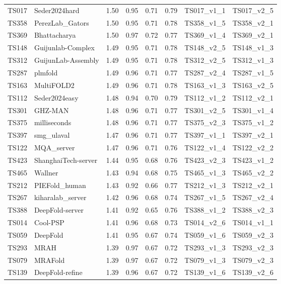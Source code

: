 \begin{table}[ht]
{\begin{tabular}{llllllll}
TS017 & Seder2024hard & 1.50 & 0.95 & 0.71 & 0.79 & TS017\_v1\_1 & TS017\_v2\_5 \\ 
TS358 & PerezLab\_Gators & 1.50 & 0.95 & 0.71 & 0.78 & TS358\_v1\_5 & TS358\_v2\_1 \\ 
TS369 & Bhattacharya & 1.50 & 0.97 & 0.72 & 0.77 & TS369\_v1\_4 & TS369\_v2\_1 \\ 
TS148 & Guijunlab-Complex & 1.49 & 0.95 & 0.71 & 0.78 & TS148\_v2\_5 & TS148\_v1\_3 \\ 
TS312 & GuijunLab-Assembly & 1.49 & 0.95 & 0.71 & 0.78 & TS312\_v2\_5 & TS312\_v1\_3 \\ 
TS287 & plmfold & 1.49 & 0.96 & 0.71 & 0.77 & TS287\_v2\_4 & TS287\_v1\_5 \\ 
TS163 & MultiFOLD2 & 1.49 & 0.96 & 0.71 & 0.78 & TS163\_v1\_3 & TS163\_v2\_5 \\ 
TS112 & Seder2024easy & 1.48 & 0.94 & 0.70 & 0.79 & TS112\_v1\_2 & TS112\_v2\_1 \\ 
TS301 & GHZ-MAN & 1.48 & 0.96 & 0.71 & 0.77 & TS301\_v2\_5 & TS301\_v1\_4 \\ 
TS375 & milliseconds & 1.48 & 0.96 & 0.71 & 0.77 & TS375\_v2\_3 & TS375\_v1\_2 \\ 
TS397 & smg\_ulaval & 1.47 & 0.96 & 0.71 & 0.77 & TS397\_v1\_1 & TS397\_v2\_1 \\ 
TS122 & MQA\_server & 1.47 & 0.96 & 0.71 & 0.76 & TS122\_v1\_4 & TS122\_v2\_2 \\ 
TS423 & ShanghaiTech-server & 1.44 & 0.95 & 0.68 & 0.76 & TS423\_v2\_3 & TS423\_v1\_2 \\ 
TS465 & Wallner & 1.43 & 0.94 & 0.68 & 0.75 & TS465\_v1\_3 & TS465\_v2\_2 \\ 
TS212 & PIEFold\_human & 1.43 & 0.92 & 0.66 & 0.77 & TS212\_v1\_3 & TS212\_v2\_1 \\ 
TS267 & kiharalab\_server & 1.42 & 0.96 & 0.68 & 0.74 & TS267\_v1\_5 & TS267\_v2\_4 \\ 
TS388 & DeepFold-server & 1.41 & 0.92 & 0.65 & 0.76 & TS388\_v1\_2 & TS388\_v2\_3 \\ 
TS014 & Cool-PSP & 1.41 & 0.96 & 0.68 & 0.73 & TS014\_v2\_6 & TS014\_v1\_1 \\ 
TS059 & DeepFold & 1.41 & 0.95 & 0.67 & 0.74 & TS059\_v1\_6 & TS059\_v2\_3 \\ 
TS293 & MRAH & 1.39 & 0.97 & 0.67 & 0.72 & TS293\_v1\_3 & TS293\_v2\_3 \\ 
TS079 & MRAFold & 1.39 & 0.97 & 0.67 & 0.72 & TS079\_v1\_3 & TS079\_v2\_3 \\ 
TS139 & DeepFold-refine & 1.39 & 0.96 & 0.67 & 0.72 & TS139\_v1\_6 & TS139\_v2\_6 \\ 

\end{tabular}}
\end{table}
